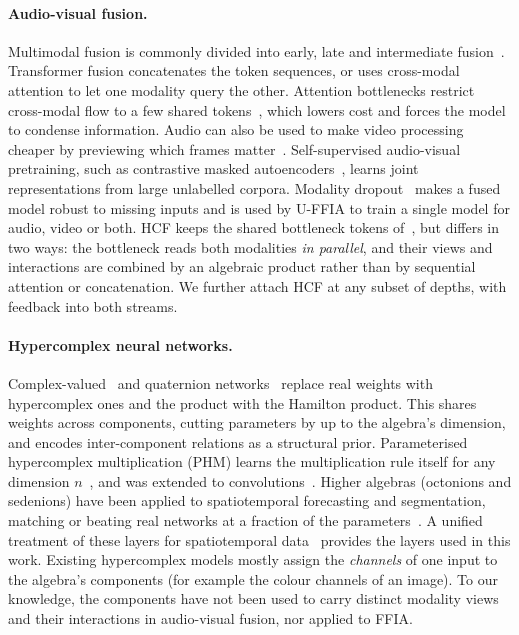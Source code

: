 \paragraph{Audio-visual fusion.}
Multimodal fusion is commonly divided into early, late and intermediate fusion~\cite{baltrusaitis2019mmml}.
Transformer fusion concatenates the token sequences, or uses cross-modal attention to let one modality
query the other. Attention bottlenecks restrict cross-modal flow to a few shared tokens~\cite{nagrani2021mbt},
which lowers cost and forces the model to condense information. Audio can also be used to make video
processing cheaper by previewing which frames matter~\cite{gao2020listen}. Self-supervised
audio-visual pretraining, such as contrastive masked autoencoders~\cite{gong2023cavmae}, learns joint
representations from large unlabelled corpora. Modality dropout~\cite{neverova2016moddrop} makes a fused model
robust to missing inputs and is used by U-FFIA to train a single model for audio, video or both. HCF
keeps the shared bottleneck tokens of~\cite{nagrani2021mbt}, but differs in two ways: the bottleneck
reads both modalities \emph{in parallel}, and their views and interactions are combined by an
algebraic product rather than by sequential attention or concatenation. We further attach HCF at any
subset of depths, with feedback into both streams.

\paragraph{Hypercomplex neural networks.}
Complex-valued~\cite{trabelsi2018complex} and quaternion networks~\cite{gaudet2018quaternion,zhu2018qcnn,parcollet2018qcnn,parcollet2019qrnn}
replace real weights with hypercomplex ones and the product with the Hamilton product. This shares
weights across components, cutting parameters by up to the algebra's dimension, and encodes
inter-component relations as a structural prior. Parameterised hypercomplex multiplication (PHM)
learns the multiplication rule itself for any dimension $n$~\cite{zhang2021phm}, and was extended to
convolutions~\cite{grassucci2022phnn}. Higher algebras (octonions and sedenions) have been applied to
spatiotemporal forecasting and segmentation, matching or beating real networks at a fraction of the
parameters~\cite{bojesomo2020sedenion,bojesomo2023octonion}. A unified treatment of these layers for
spatiotemporal data~\cite{bojesomo2024hypercomplex} provides the layers used in this work. Existing
hypercomplex models mostly assign the \emph{channels} of one input to the algebra's components (for
example the colour channels of an image). To our knowledge, the components have not been used to
carry distinct modality views and their interactions in audio-visual fusion, nor applied to FFIA.

